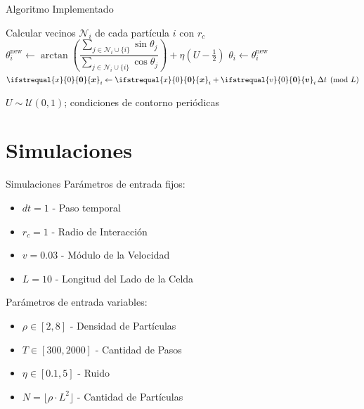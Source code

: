 \documentclass{beamer}
\renewcommand\vec[1]{\ifstrequal{#1}{0}{\ensuremath{\mathbf{0}}}{\ensuremath{\boldsymbol{#1}}}}
\begin{document}
\begin{frame}{Algoritmo Implementado}
    \begin{algorithm}[H]
    \small
        \caption{Paso de simulación — Modelo de Vicsek}
        \begin{algorithmic}[1]
            \State Calcular vecinos $\mathcal{N}_i$ de cada partícula $i$ con $r_c$
                \State $\theta_i^{\text{new}} \gets \arctan\!\left(\dfrac{\displaystyle\sum_{j \in \mathcal{N}_i \cup \{i\}} \sin\theta_j}{\displaystyle\sum_{j \in \mathcal{N}_i \cup \{i\}} \cos\theta_j}\right) + \eta\left(U - \tfrac{1}{2}\right)$
            \EndFor
                \State $\theta_i \gets \theta_i^{\text{new}}$
                \State $\vec{x}_i \gets \vec{x}_i + \vec{v}_i \,\Delta t \pmod{L}$
            \EndFor
        \end{algorithmic}
    \end{algorithm}
    \vspace{0.2cm}
    \footnotesize{$U \sim \mathcal{U}(0,1)$; condiciones de contorno periódicas}
\end{frame}

\section{Simulaciones}

\begin{frame}{Simulaciones}
    Parámetros de entrada fijos:
    \begin{itemize}
        \item $dt=1$ - Paso temporal
        \item $r_c=1$ - Radio de Interacción
        \item $v=0.03$ - Módulo de la Velocidad
        \item $L=10$ - Longitud del Lado de la Celda
    \end{itemize}
    Parámetros de entrada variables:
    \begin{itemize}
        \item $\rho\in[2, 8]$ - Densidad de Partículas
        \item $T\in[300, 2000]$ - Cantidad de Pasos
        \item $\eta\in[0.1, 5]$ - Ruido
        \item $N = \lfloor \rho \cdot L^2 \rfloor$ - Cantidad de Partículas
    \end{itemize}
\end{frame}
\end{document}
